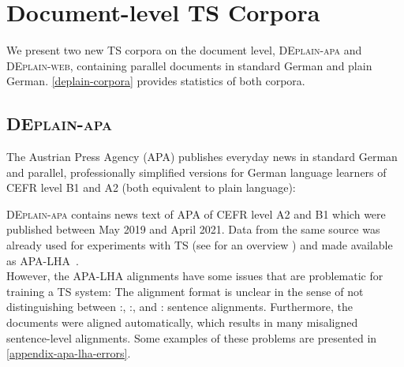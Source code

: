 \documentclass[11pt]{article}
\begin{document}
\begin{table*}[htb]
\caption{Overview of the corpora of \textsc{DEplain} including meta data. 
} 

\label{deplain-corpora}
\end{table*}


\section{Document-level TS Corpora}
We present two new TS corpora on the document level, \textsc{DEplain-apa} and \textsc{DEplain-web}, containing 
parallel documents in standard German and plain German. 
  \autoref{deplain-corpora} provides statistics of both corpora. 



\subsection{\textsc{DEplain-apa}}
\label{sec-deplain-apa}
The Austrian Press Agency (APA) publishes everyday news in standard German and parallel, professionally simplified versions for German language learners of CEFR level B1 and A2 (both equivalent to plain language):

\textsc{DEplain-apa} contains news text of APA of CEFR level A2 and B1 which were published between May 2019 and April 2021. Data from the same source was already used for experiments with TS (see for an overview \citet{ebling-etal-2022-automatic}) and made available as APA-LHA~\cite{spring-etal-2021-exploring}. \\
However, the APA-LHA alignments  have some issues that are problematic for training a TS system: The alignment format is unclear in the sense of not distinguishing between :, :, and : sentence alignments. Furthermore, the documents were aligned automatically, which results in many misaligned sentence-level alignments. Some examples of these problems are presented in \autoref{appendix-apa-lha-errors}.\par
\end{document}
